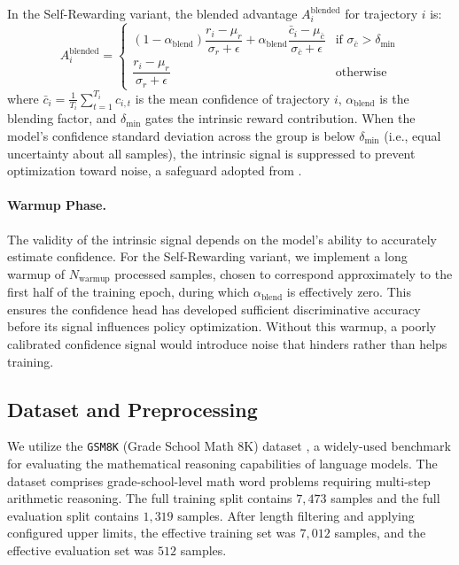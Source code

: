 \documentclass[a4paper,oneside,10pt,ngerman,english]{scrartcl}
\begin{document}
In the Self-Rewarding variant, the blended advantage $A^{\mathrm{blended}}_i$ for trajectory $i$ is:
\begin{equation}
	A^{\mathrm{blended}}_i =
	\begin{cases}
		(1 - \alpha_{\mathrm{blend}}) \dfrac{r_i - \mu_r}{\sigma_r + \epsilon} + \alpha_{\mathrm{blend}} \dfrac{\bar{c}_i - \mu_{\bar{c}}}{\sigma_{\bar{c}} + \epsilon} & \text{if } \sigma_{\bar{c}} > \delta_{\mathrm{min}} \\[12pt]
		\dfrac{r_i - \mu_r}{\sigma_r + \epsilon}                                                                                                                        & \text{otherwise}
	\end{cases}
\end{equation}
where $\bar{c}_i = \frac{1}{T_i}\sum_{t=1}^{T_i} c_{i,t}$ is the mean confidence of trajectory $i$, $\alpha_{\mathrm{blend}}$ is the blending factor, and $\delta_{\mathrm{min}}$ gates the intrinsic reward contribution. When the model's confidence standard deviation across the group is below $\delta_{\mathrm{min}}$ (i.e., equal uncertainty about all samples), the intrinsic signal is suppressed to prevent optimization toward noise, a safeguard adopted from \citet{laser}.

\paragraph{Warmup Phase.}
The validity of the intrinsic signal depends on the model's ability to accurately estimate confidence. For the Self-Rewarding variant, we implement a long warmup of $N_{\mathrm{warmup}}$ processed samples, chosen to correspond approximately to the first half of the training epoch, during which $\alpha_{\mathrm{blend}}$ is effectively zero. This ensures the confidence head has developed sufficient discriminative accuracy before its signal influences policy optimization. Without this warmup, a poorly calibrated confidence signal would introduce noise that hinders rather than helps training.

\subsection{Dataset and Preprocessing}
\label{sec:dataset}
We utilize the \texttt{GSM8K} (Grade School Math 8K) dataset \citep{gsm8k}, a widely-used benchmark for evaluating the mathematical reasoning capabilities of language models. The dataset comprises grade-school-level math word problems requiring multi-step arithmetic reasoning. The full training split contains $7{,}473$ samples and the full evaluation split contains $1{,}319$ samples. After length filtering and applying configured upper limits, the effective training set was $7{,}012$ samples, and the effective evaluation set was $512$ samples.
\end{document}
